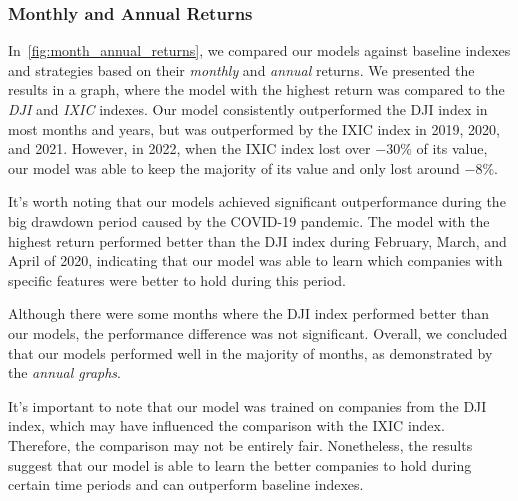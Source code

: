 \documentclass[../xlapes02]{subfiles}
\begin{document}
    \subsubsection{Monthly and Annual Returns}
    In~\cref{fig:month_annual_returns}, we compared our models against baseline indexes and strategies based on their \emph{monthly} and \emph{annual} returns. We presented the results in a graph, where the model with the highest return was compared to the \emph{DJI} and \emph{IXIC} indexes. Our model consistently outperformed the DJI index in most months and years, but was outperformed by the IXIC index in 2019, 2020, and 2021. However, in 2022, when the IXIC index lost over $-30\%$ of its value, our model was able to keep the majority of its value and only lost around $-8\%$.

    It's worth noting that our models achieved significant outperformance during the big drawdown period caused by the COVID-19 pandemic. The model with the highest return performed better than the DJI index during February, March, and April of 2020, indicating that our model was able to learn which companies with specific features were better to hold during this period.

    Although there were some months where the DJI index performed better than our models, the performance difference was not significant. Overall, we concluded that our models performed well in the majority of months, as demonstrated by the \emph{annual graphs}.

    It's important to note that our model was trained on companies from the DJI index, which may have influenced the comparison with the IXIC index. Therefore, the comparison may not be entirely fair. Nonetheless, the results suggest that our model is able to learn the better companies to hold during certain time periods and can outperform baseline indexes.
\end{document}
